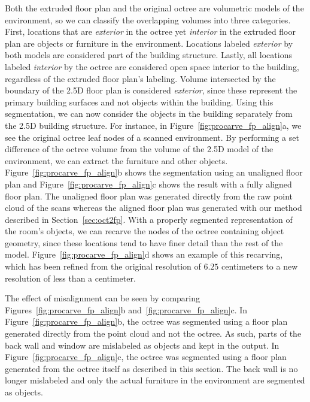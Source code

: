 \documentclass[12pt,onecolumn,oneside]{book}
\begin{document}
Both the extruded floor plan and the original octree are volumetric models of the environment, so we can classify the overlapping volumes into three categories.  First, locations that are {\it exterior} in the octree yet {\it interior} in the extruded floor plan are objects or furniture in the environment.  Locations labeled {\it exterior} by both models are considered part of the building structure.  Lastly, all locations labeled {\it interior} by the octree are considered open space interior to the building, regardless of the extruded floor plan's labeling.  Volume intersected by the boundary of the 2.5D floor plan is considered {\it exterior}, since these represent the primary building surfaces and not objects within the building.  Using this segmentation, we can now consider the objects in the building separately from the 2.5D building structure.  For instance, in Figure~\ref{fig:procarve_fp_align}a, we see the original octree leaf nodes of a scanned environment.  By performing a set difference of the octree volume from the volume of the 2.5D model of the environment, we can extract the furniture and other objects.  Figure~\ref{fig:procarve_fp_align}b shows the segmentation using an unaligned floor plan and Figure~\ref{fig:procarve_fp_align}c shows the result with a fully aligned floor plan.  The unaligned floor plan was generated directly from the raw point cloud of the scans whereas the aligned floor plan was generated with our method described in Section~\ref{sec:oct2fp}.  With a properly segmented representation of the room's objects, we can recarve the nodes of the octree containing object geometry, since these locations tend to have finer detail than the rest of the model.  Figure~\ref{fig:procarve_fp_align}d shows an example of this recarving, which has been refined from the original resolution of $6.25$ centimeters to a new resolution of less than a centimeter.


The effect of misalignment can be seen by comparing Figures~\ref{fig:procarve_fp_align}b and~\ref{fig:procarve_fp_align}c.  In Figure~\ref{fig:procarve_fp_align}b, the octree was segmented using a floor plan generated directly from the point cloud and not the octree.  As such, parts of the back wall and window are mislabeled as objects and kept in the output.  In Figure~\ref{fig:procarve_fp_align}c, the octree was segmented using a floor plan generated from the octree itself as described in this section.  The back wall is no longer mislabeled and only the actual furniture in the environment are segmented as objects.
\end{document}
